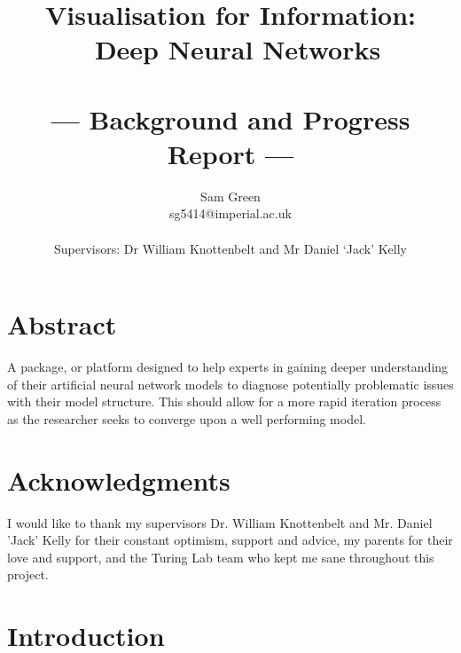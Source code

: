 \documentclass[a4paper,11pt,titlepage]{article}
\title{Visualisation for Information: \\\ Deep Neural Networks \\\ \\\Large{--- Background and Progress Report ---}}
\author{Sam Green\\
       \small{sg5414@imperial.ac.uk}\\ \\
       \small{Supervisors: Dr William Knottenbelt and Mr Daniel `Jack' Kelly}
}
\begin{document}
\maketitle

\clearpage
\clearpage

\section*{Abstract}
A package, or platform designed to help experts in gaining deeper understanding of their artificial neural network models to diagnose potentially problematic issues with their model structure. This should allow for a more rapid iteration process as the researcher seeks to converge upon a well performing model.
\clearpage

\section*{Acknowledgments}
I would like to thank my supervisors Dr. William Knottenbelt and Mr. Daniel 'Jack' Kelly for their constant optimism, support and advice, my parents for their love and support, and the Turing Lab team who kept me sane throughout this project.

\clearpage

\tableofcontents

\clearpage

\section{Introduction}
\end{document}
